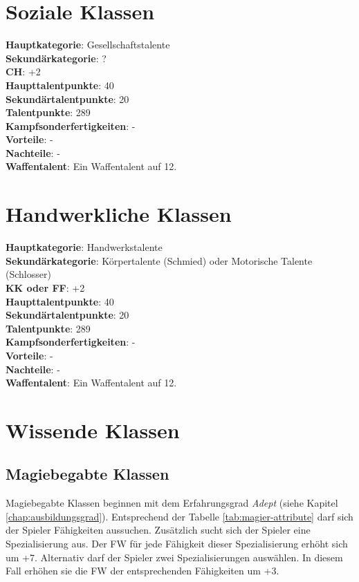 \section{Soziale Klassen}
\textbf{Hauptkategorie}: Gesellschaftstalente \\
\textbf{Sekundärkategorie}: ? \\
\textbf{CH}: +2 \\
\textbf{Haupttalentpunkte}: 40 \\
\textbf{Sekundärtalentpunkte}: 20 \\
\textbf{Talentpunkte}: 289 \\
\textbf{Kampfsonderfertigkeiten}: - \\
\textbf{Vorteile}: - \\
\textbf{Nachteile}: - \\
\textbf{Waffentalent}: Ein Waffentalent auf 12.

\section{Handwerkliche Klassen}
\textbf{Hauptkategorie}: Handwerkstalente \\
\textbf{Sekundärkategorie}: Körpertalente (Schmied) oder Motorische Talente (Schlosser) \\
\textbf{KK oder FF}: +2 \\
\textbf{Haupttalentpunkte}: 40 \\
\textbf{Sekundärtalentpunkte}: 20 \\
\textbf{Talentpunkte}: 289 \\
\textbf{Kampfsonderfertigkeiten}: - \\
\textbf{Vorteile}: - \\
\textbf{Nachteile}: - \\
\textbf{Waffentalent}: Ein Waffentalent auf 12.

\section{Wissende Klassen}
\subsection{Magiebegabte Klassen}
Magiebegabte Klassen beginnen mit dem Erfahrungsgrad \textit{Adept} (siehe Kapitel \ref{chap:ausbildungsgrad}). Entsprechend der Tabelle \ref{tab:magier-attribute} darf sich der Spieler Fähigkeiten aussuchen. Zusätzlich sucht sich der Spieler eine Spezialisierung aus. Der FW für jede Fähigkeit dieser Spezialisierung erhöht sich um +7. Alternativ darf der Spieler zwei Spezialisierungen auswählen. In diesem Fall erhöhen sie die FW der entsprechenden Fähigkeiten um +3.

